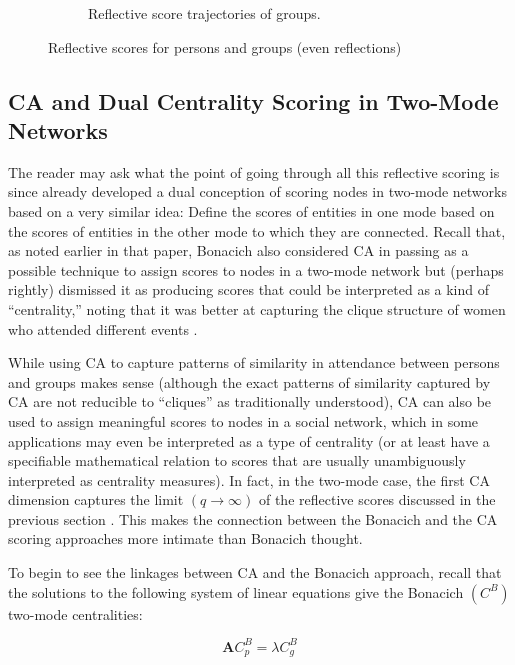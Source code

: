 \documentclass[a4paper,fleqn]{cas-sc}
\begin{document}
\begin{figure}[ht!]
\begin{subfigure}[b]{0.45\textwidth}
            \caption{Reflective score trajectories of groups.}
            \label{fig:g-refs}
    \end{subfigure}
    \caption{Reflective scores for persons and groups (even reflections)}
    \label{fig:refs}
\end{figure}

\subsection{CA and Dual Centrality Scoring in Two-Mode Networks} \label{sec:ca}
The reader may ask what the point of going through all this reflective scoring is since \citet{bonacich1991simultaneous} already developed a dual conception of scoring nodes in two-mode networks based on a very similar idea: Define the scores of entities in one mode based on the scores of entities in the other mode to which they are connected. Recall that, as noted earlier in that paper, Bonacich also considered CA in passing as a possible technique to assign scores to nodes in a two-mode network but (perhaps rightly) dismissed it as producing scores that could be interpreted as a kind of ``centrality,'' noting that it was better at capturing the clique structure of women who attended different events \citeyearpar[164]{bonacich1991simultaneous}. 

While using CA to capture patterns of similarity in attendance between persons and groups makes sense (although the exact patterns of similarity captured by CA are not reducible to ``cliques'' as traditionally understood), CA can also be used to assign meaningful scores to nodes in a social network, which in some applications may even be interpreted as a type of centrality (or at least have a specifiable mathematical relation to scores that are usually unambiguously interpreted as centrality measures). In fact, in the two-mode case, the first CA dimension captures the limit $(q \rightarrow \infty)$ of the reflective scores discussed in the previous section \citep{mealy2019interpreting}. This makes the connection between the Bonacich and the CA scoring approaches more intimate than Bonacich thought. 

To begin to see the linkages between CA and the Bonacich approach, recall that the solutions to the following system of linear equations give the Bonacich $(C^B)$ two-mode centralities:

\begin{equation}
    \mathbf{A}C^B_p = \lambda C^B_g 
    \label{eq:bon1}
\end{equation}
\end{document}
